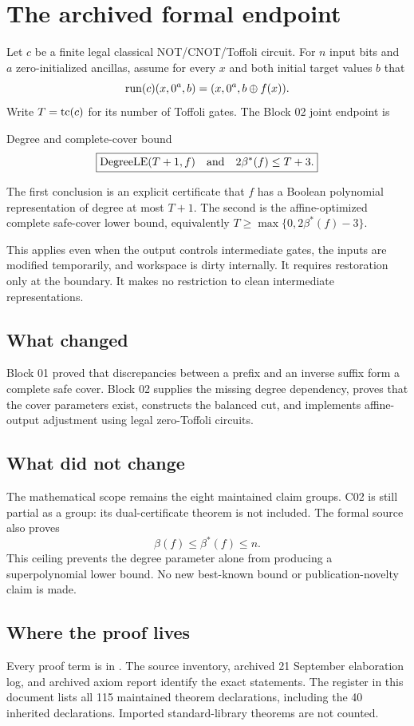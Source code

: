 \section*{The archived formal endpoint}
Let $c$ be a finite legal classical NOT/CNOT/Toffoli circuit. For $n$ input bits and $a$ zero-initialized ancillas, assume for every $x$ and both initial target values $b$ that
\[
\operatorname{run}(c)(x,0^a,b)=(x,0^a,b\mathbin{\oplus} f(x)).
\]
Write $T=\operatorname{tc}(c)$ for its number of Toffoli gates. The Block 02 joint endpoint is
\begin{statusbox}{Degree and complete-cover bound}
\[
\boxed{\operatorname{DegreeLE}(T+1,f)\quad\text{and}\quad 2\beta^*(f)\le T+3.}
\]
\end{statusbox}
The first conclusion is an explicit certificate that $f$ has a Boolean polynomial representation of degree at most $T+1$. The second is the affine-optimized complete safe-cover lower bound, equivalently $T\ge\max\{0,2\beta^*(f)-3\}$.

This applies even when the output controls intermediate gates, the inputs are modified temporarily, and workspace is dirty internally. It requires restoration only at the boundary. It makes no restriction to clean intermediate representations.

\subsection*{What changed}
Block 01 proved that discrepancies between a prefix and an inverse suffix form a complete safe cover. Block 02 supplies the missing degree dependency, proves that the cover parameters exist, constructs the balanced cut, and implements affine-output adjustment using legal zero-Toffoli circuits.

\subsection*{What did not change}
The mathematical scope remains the eight maintained claim groups. C02 is still partial as a group: its dual-certificate theorem is not included. The formal source also proves
\[
\beta(f)\le\beta^*(f)\le n.
\]
This ceiling prevents the degree parameter alone from producing a superpolynomial lower bound. No new best-known bound or publication-novelty claim is made.

\subsection*{Where the proof lives}
Every proof term is in . The source inventory, archived 21 September elaboration log, and archived axiom report identify the exact statements. The register in this document lists all 115 maintained theorem declarations, including the 40 inherited declarations. Imported standard-library theorems are not counted.


